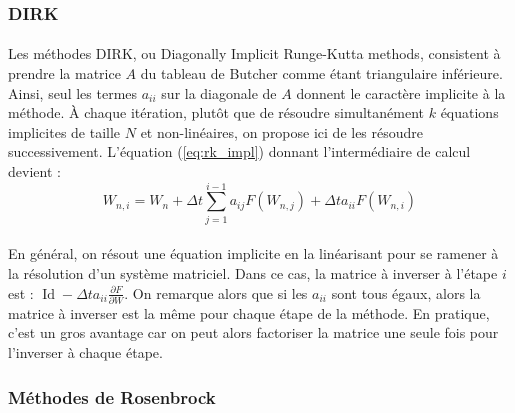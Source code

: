     \subsubsection{DIRK}

      \paragraph{}
      Les méthodes DIRK\cite{Alexander1977}, ou Diagonally Implicit Runge-Kutta methods, consistent à prendre la matrice $A$ du tableau de Butcher comme étant triangulaire inférieure.
      Ainsi, seul les termes $a_{ii}$ sur la diagonale de $A$ donnent le caractère implicite à la méthode.
      À chaque itération, plutôt que de résoudre simultanément $k$ équations implicites de taille $N$ et non-linéaires, on propose ici de les résoudre successivement.
      L'équation (\ref{eq:rk_impl}) donnant l'intermédiaire de calcul devient :
      \begin{equation}\label{eq:rk_dirk}
        W_{n,i} = W_n + \Delta t\sum_{j = 1}^{i-1}a_{ij}F\left(W_{n,j}\right) + \Delta ta_{ii}F\left(W_{n,i}\right)
      \end{equation}

      \paragraph{}
      En général, on résout une équation implicite en la linéarisant pour se ramener à la résolution d'un système matriciel.
      Dans ce cas, la matrice à inverser à l'étape $i$ est : $\operatorname{Id} - \Delta ta_{ii}\frac{\partial F}{\partial W}$.
      On remarque alors que si les $a_{ii}$ sont tous égaux, alors la matrice à inverser est la même pour chaque étape de la méthode.
      En pratique, c'est un gros avantage car on peut alors factoriser la matrice une seule fois pour l'inverser à chaque étape.

    \subsubsection{Méthodes de Rosenbrock}

